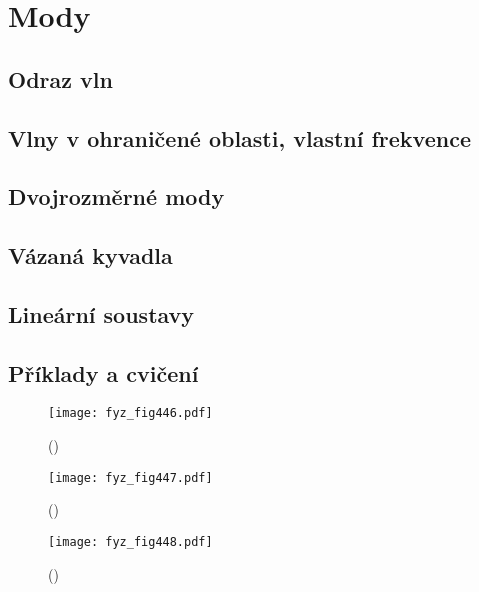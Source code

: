 \setchaptertoc
\chapter{Mody}\label{fyz:IchapIL}

  \section{Odraz vln}\label{fyz:IchapILsecI}
  \section{Vlny v ohraničené oblasti, vlastní frekvence}\label{fyz:IchapILsecII}
  \section{Dvojrozměrné mody}\label{fyz:IchapILsecIII}
  \section{Vázaná kyvadla}\label{fyz:IchapILsecIV}
  \section{Lineární soustavy}\label{fyz:IchapILsecV}
  \section{Příklady a cvičení}\label{fyz:IchapILsecVI}

    \begin{figure}[ht!] %
      \centering
      \texttt{[image: fyz\_fig446.pdf]}
      \caption{ 
               (\cite[s.~707]{Feynman01})}
      \label{fyz:fig446}
    \end{figure}

    \begin{figure}[ht!] %
      \centering
      \texttt{[image: fyz\_fig447.pdf]}
      \caption{ 
               (\cite[s.~707]{Feynman01})}
      \label{fyz:fig447}
    \end{figure}

    \begin{figure}[ht!] %
      \centering
      \texttt{[image: fyz\_fig448.pdf]}
      \caption{ 
               (\cite[s.~707]{Feynman01})}
      \label{fyz:fig448}
    \end{figure}

